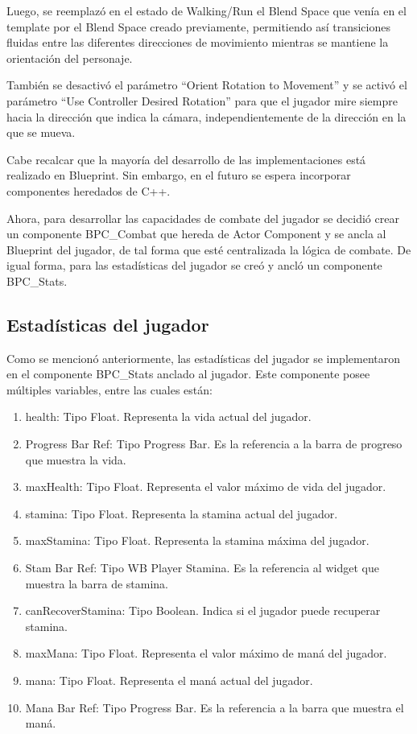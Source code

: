 \documentclass[informe]{upropuesta}
\begin{document}
Luego, se reemplazó en el estado de Walking/Run el Blend Space que venía en el template por el Blend Space creado previamente, permitiendo así transiciones fluidas entre las diferentes direcciones de movimiento mientras se mantiene la orientación del personaje.

También se desactivó el parámetro ``Orient Rotation to Movement'' y se activó el parámetro ``Use Controller Desired Rotation'' para que el jugador mire siempre hacia la dirección que indica la cámara, independientemente de la dirección en la que se mueva.

Cabe recalcar que la mayoría del desarrollo de las implementaciones está realizado en Blueprint. Sin embargo, en el futuro se espera incorporar componentes heredados de C++.

Ahora, para desarrollar las capacidades de combate del jugador se decidió crear un componente BPC\_Combat que hereda de Actor Component y se ancla al Blueprint del jugador, de tal forma que esté centralizada la lógica de combate. De igual forma, para las estadísticas del jugador se creó y ancló un componente BPC\_Stats.

\subsection{Estadísticas del jugador}

Como se mencionó anteriormente, las estadísticas del jugador se implementaron en el componente BPC\_Stats anclado al jugador. Este componente posee múltiples variables, entre las cuales están:

\begin{enumerate}
    \item health: Tipo Float. Representa la vida actual del jugador.
    \item Progress Bar Ref: Tipo Progress Bar. Es la referencia a la barra de progreso que muestra la vida.
    \item maxHealth: Tipo Float. Representa el valor máximo de vida del jugador.
    \item stamina: Tipo Float. Representa la stamina actual del jugador.
    \item maxStamina: Tipo Float. Representa la stamina máxima del jugador.
    \item Stam Bar Ref: Tipo WB Player Stamina. Es la referencia al widget que muestra la barra de stamina.
    \item canRecoverStamina: Tipo Boolean. Indica si el jugador puede recuperar stamina.
    \item maxMana: Tipo Float. Representa el valor máximo de maná del jugador.
    \item mana: Tipo Float. Representa el maná actual del jugador.
    \item Mana Bar Ref: Tipo Progress Bar. Es la referencia a la barra que muestra el maná.
\end{enumerate}
\end{document}
